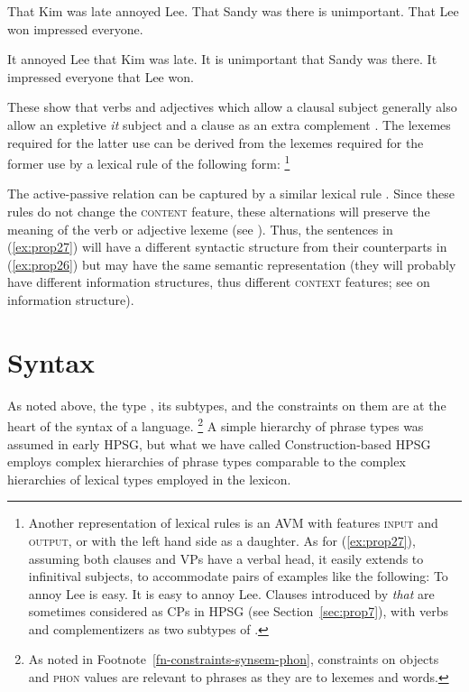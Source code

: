 \documentclass[output=paper
	        ,collection
	        ,collectionchapter
 	        ,biblatex
                ,babelshorthands
                ,newtxmath
                ,draftmode
                ,colorlinks, citecolor=brown
]{langscibook}
\begin{document}
\eal\label{ex:prop26}
\ex That Kim was late annoyed Lee.
\ex That Sandy was there is unimportant. 
\ex That Lee won impressed everyone.
\zl
	
\eal\label{ex:prop27}
\ex It annoyed Lee that Kim was late.
\ex It is unimportant that Sandy was there. 
\ex It impressed everyone that Lee won.
\zl

These show that verbs and adjectives which allow a clausal subject generally also allow an expletive \emph{it} subject and a clause as an extra complement \citep[150]{ps2}. The lexemes required for the latter use can be derived from the lexemes required for the former use by a lexical rule of the following form:%
%
\footnote{Another representation of lexical rules is an AVM with features \textsc{input} and \textsc{output}, or with the left hand side as a daughter. As for (\ref{ex:prop27}), assuming both clauses and VPs have a verbal head, it easily extends to infinitival subjects, to accommodate pairs of examples like the following:
	\eal
        \ex To annoy Lee is easy.
	\ex It is easy to annoy Lee.
	\zl
Clauses introduced by \emph{that} are sometimes considered as CPs in HPSG (see Section~\ref{sec:prop7}), with verbs and complementizers as two subtypes of .
}
%

\ea\label{ex:prop28}
\avmtmp{[arg-st & < S > \+ \2] $\mapsto$
	[arg-st & < NP![\type{it}]! > \+ \2 \+ < S >]}
\z

The active-passive relation can be captured by a similar lexical rule
\citep[Section~5.1.1]{Flickinger87}. Since these rules do not change the \textsc{content} feature,
these alternations will preserve the meaning of the verb or adjective lexeme (see
). Thus, the sentences in (\ref{ex:prop27}) will have a different
syntactic structure from their counterparts in (\ref{ex:prop26}) but may have the same semantic
representation (they will probably have different information structures, thus different
\textsc{context} features; see  on information structure).


\section{Syntax}\label{sec:prop5}
\label{prop:sec-syntax}

As noted above, the type , its subtypes, and the constraints on them are at the heart of the syntax of a language.%
%
\footnote{As noted in Footnote~\ref{fn-constraints-synsem-phon}, constraints on  objects and \textsc{phon} values are relevant to phrases as they are to lexemes and words.}
%
A simple hierarchy of phrase types was assumed in early HPSG, but what we have called Construction-based HPSG employs complex hierarchies of phrase types comparable to the complex hierarchies of lexical types employed in the lexicon.
\end{document}
